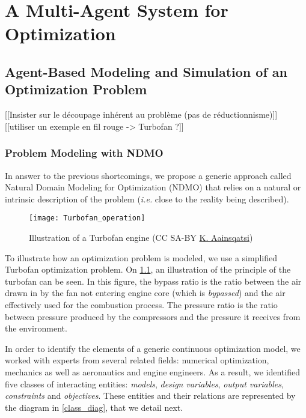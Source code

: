 \part{A Multi-Agent System for Optimization}

\chapter{Agent-Based Modeling and Simulation of an Optimization Problem}

[[Insister sur le découpage inhérent au problème (pas de réductionnisme)]]
[[utiliser un exemple en fil rouge -> Turbofan ?]]

\section{Problem Modeling with NDMO}\label{modeling}

In answer to the previous shortcomings, we propose a generic approach called Natural Domain Modeling for Optimization (NDMO) that relies on a natural or intrinsic description of the problem (\textit{i.e.} close to the reality being described).

\begin{figure}[]
	\centering
	\texttt{[image: Turbofan\_operation]}
	\caption{Illustration of a Turbofan engine (CC SA-BY  \href{http://en.wikipedia.org/wiki/File:Turbofan_operation.svg}{K. Aainsqatsi})}
	\label{turbofan_illu}
\end{figure}

To illustrate how an optimization problem is modeled, we use a simplified Turbofan optimization problem. On \figurename{} \ref{turbofan_illu}, an illustration of the principle of the turbofan can be seen. In this figure, the bypass ratio is the ratio between the air drawn in by the fan not entering engine core (which is \emph{bypassed}) and the air effectively used for the combustion process. The pressure ratio is the ratio between pressure produced by the compressors and the pressure it receives from the environment.

In order to identify the elements of a generic continuous optimization model, we worked with experts from several related fields: numerical optimization, mechanics as well as aeronautics and engine engineers. As a result, we identified five classes of interacting entities: \emph{models}, \emph{design variables}, \emph{output variables}, \emph{constraints} and \emph{objectives}. These entities and their relations are represented by the diagram in \figurename{} \ref{class_diag}, that we detail next.

